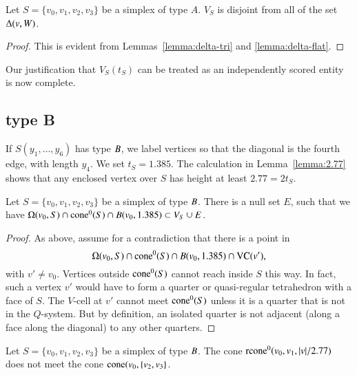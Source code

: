 \begin{lemma} Let $S=\{v_0,v_1,v_2,v_3\}$ be a simplex of type $A$.
  $V_S$ is disjoint from all of the set $\Delta(v,W)$.
\end{lemma}

\begin{proof}
This is evident from
Lemmas~\ref{lemma:delta-tri} and \ref{lemma:delta-flat}.
\end{proof}


Our justification that $V_S(t_S)$ can be treated as an
independently scored entity is now complete.

\subsection{type B}%

If $S(y_1,\ldots,y_6)$ has type $B$, we label vertices so that
the diagonal is the fourth edge, with length $y_4$. We set
$t_S=1.385$. The calculation in Lemma~\ref{lemma:2.77}
shows that any enclosed vertex over $S$ has height at least
$2.77=2t_S$.

\begin{lemma} Let $S=\{v_0,v_1,v_2,v_3\}$ be a simplex of type $B$.
There is a null set $E$, such that
we have  $ \Omega(v_0,S) \cap {\operatorname{cone}}^0(S) \cap B(v_0,1.385) 
\subset V_S \cup E$.
\end{lemma}

\begin{proof}  As above, assume for a contradiction that there
is a point in 
 $$\Omega(v_0,S)\cap {\operatorname{cone}}^0(S) \cap B(v_0,1.385)\cap {\operatorname{VC}}(v'),$$
with $v'\ne v_0$.
Vertices outside ${\operatorname{cone}}^0(S)$ cannot reach inside $S$ this way.  In
fact, such a vertex $v'$ would have to form a quarter or
quasi-regular tetrahedron with a face of $S$.  The $V$-cell at
$v'$ cannot meet ${\operatorname{cone}}^0(S)$ unless it is a quarter that is not in the
$Q$-system. But by definition, an isolated quarter is not adjacent
(along a face along the diagonal) to any other quarters.
\end{proof}


\begin{lemma} Let $S=\{v_0,v_1,v_2,v_3\}$ be a simplex of type $B$.
The cone ${\operatorname{rcone}}^0(v_0,v_1,|v|/2.77)$ does not meet the
cone ${\operatorname{cone}}(v_0,\{v_2,v_3\}$.
\end{lemma}

